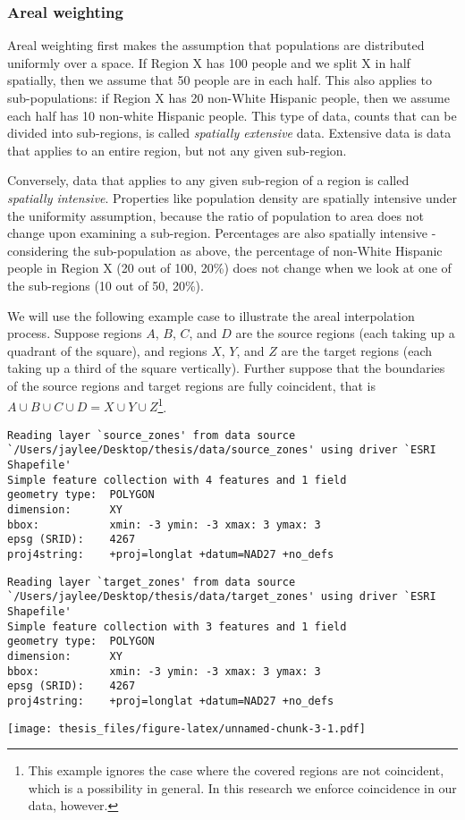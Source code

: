 \documentclass[12pt,twoside]{reedthesis}
\theoremstyle{definition}
\theoremstyle{definition}
\theoremstyle{definition}
\theoremstyle{remark}
\begin{document}
\hypertarget{areal-weighting}{%
\subsubsection{Areal weighting}\label{areal-weighting}}

Areal weighting first makes the assumption that populations are
distributed uniformly over a space. If Region X has 100 people and we
split X in half spatially, then we assume that 50 people are in each
half. This also applies to sub-populations: if Region X has 20 non-White
Hispanic people, then we assume each half has 10 non-white Hispanic
people. This type of data, counts that can be divided into sub-regions,
is called \emph{spatially extensive} data. Extensive data is data that
applies to an entire region, but not any given sub-region.

Conversely, data that applies to any given sub-region of a region is
called \emph{spatially intensive}. Properties like population density
are spatially intensive under the uniformity assumption, because the
ratio of population to area does not change upon examining a sub-region.
Percentages are also spatially intensive - considering the
sub-population as above, the percentage of non-White Hispanic people in
Region X (20 out of 100, 20\%) does not change when we look at one of
the sub-regions (10 out of 50, 20\%).

We will use the following example case to illustrate the areal
interpolation process. Suppose regions \(A\), \(B\), \(C\), and \(D\)
are the source regions (each taking up a quadrant of the square), and
regions \(X\), \(Y\), and \(Z\) are the target regions (each taking up a
third of the square vertically). Further suppose that the boundaries of
the source regions and target regions are fully coincident, that is
\(A \cup B \cup C \cup D = X \cup Y \cup Z\)\footnote{This example
  ignores the case where the covered regions are not coincident, which
  is a possibility in general. In this research we enforce coincidence
  in our data, however.}.
\begin{verbatim}
Reading layer `source_zones' from data source `/Users/jaylee/Desktop/thesis/data/source_zones' using driver `ESRI Shapefile'
Simple feature collection with 4 features and 1 field
geometry type:  POLYGON
dimension:      XY
bbox:           xmin: -3 ymin: -3 xmax: 3 ymax: 3
epsg (SRID):    4267
proj4string:    +proj=longlat +datum=NAD27 +no_defs
\end{verbatim}
\begin{verbatim}
Reading layer `target_zones' from data source `/Users/jaylee/Desktop/thesis/data/target_zones' using driver `ESRI Shapefile'
Simple feature collection with 3 features and 1 field
geometry type:  POLYGON
dimension:      XY
bbox:           xmin: -3 ymin: -3 xmax: 3 ymax: 3
epsg (SRID):    4267
proj4string:    +proj=longlat +datum=NAD27 +no_defs
\end{verbatim}
\texttt{[image: thesis\_files/figure-latex/unnamed-chunk-3-1.pdf]}
\end{document}
